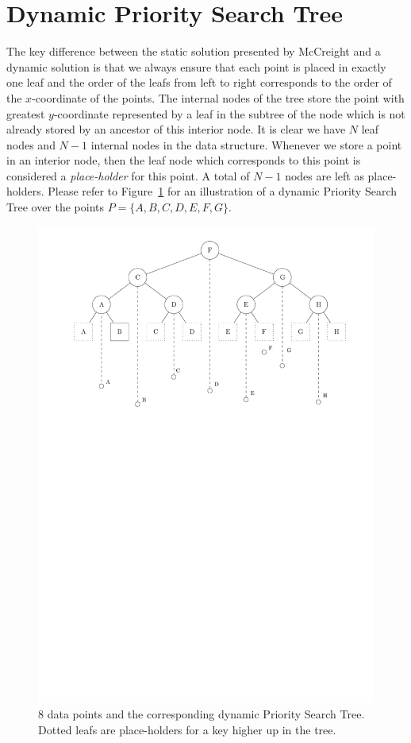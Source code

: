\documentclass[twoside,11pt,openright]{report}
\begin{document}
\section{Dynamic Priority Search Tree}
The key difference between the static solution presented by McCreight and a dynamic solution is that we always ensure that each point is placed in exactly one leaf and the order of the leafs from left to right corresponds to the order of the $x$-coordinate of the points. The internal nodes of the tree store the point with greatest $y$-coordinate represented by a leaf in the subtree of the node which is not already stored by an ancestor of this interior node. It is clear we have $N$ leaf nodes and $N-1$ internal nodes in the data structure.
Whenever we store a point in an interior node, then the leaf node which corresponds to this point is considered a \textit{place-holder} for this point. A total of $N - 1$ nodes are left as place-holders. Please refer to Figure~\ref{fig:dynamic_pst} for an illustration of a dynamic Priority Search Tree over the points $P = \{A, B, C, D, E, F, G \}$.

\begin{figure}[h]
	\centering
	\includegraphics[scale=0.68]{../figures/internal_pst_dynamic}
	\caption{8 data points and the corresponding dynamic Priority Search Tree. Dotted leafs are place-holders for a key higher up in the tree.}
	\label{fig:dynamic_pst}
\end{figure}
\end{document}
